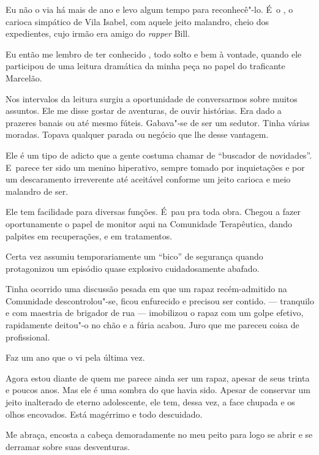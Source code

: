  

Eu não o via há mais de ano e levo algum tempo para reconhecê"-lo. É~o
, o carioca simpático de Vila Isabel, com aquele jeito malandro, cheio
dos expedientes, cujo irmão era amigo do \emph{rapper}  Bill.

Eu então me lembro de ter conhecido , todo solto e bem à vontade,
quando ele participou de uma leitura dramática da minha peça no papel do
traficante Marcelão.

Nos intervalos da leitura surgiu a oportunidade de conversarmos sobre
muitos assuntos. Ele me disse gostar de aventuras, de ouvir histórias.
Era dado a prazeres banais ou até mesmo fúteis. Gabava"-se de ser um
sedutor. Tinha várias moradas. Topava qualquer parada ou negócio que lhe
desse vantagem.

Ele é um tipo de adicto que a gente costuma chamar de ``buscador de
novidades''. E~parece ter sido um menino hiperativo, sempre tomado por
inquietações e por um descaramento irreverente até aceitável conforme um
jeito carioca e meio malandro de ser.

Ele tem facilidade para diversas funções. É~pau pra toda obra. Chegou a
fazer oportunamente o papel de monitor aqui na Comunidade Terapêutica,
dando palpites em recuperações, e em tratamentos.

Certa vez assumiu temporariamente um ``bico'' de segurança quando
protagonizou um episódio quase explosivo cuidadosamente abafado.

Tinha ocorrido uma discussão pesada em que um rapaz recém-admitido na
Comunidade descontrolou"-se, ficou enfurecido e precisou ser contido. 
--- tranquilo e com maestria de brigador de rua --- imobilizou o rapaz
com um golpe efetivo, rapidamente deitou"-o no chão e a fúria acabou.
Juro que me pareceu coisa de profissional.

\asterisc{}

Faz um ano que o vi pela última vez.

Agora estou diante de quem me parece ainda ser um rapaz, apesar de seus
trinta e poucos anos. Mas ele é uma sombra do que havia sido. Apesar de
conservar um jeito inalterado de eterno adolescente, ele tem, dessa vez,
a face chupada e os olhos encovados. Está magérrimo e todo descuidado.

Me abraça, encosta a cabeça demoradamente no meu peito para logo se
abrir e se derramar sobre suas desventuras.

